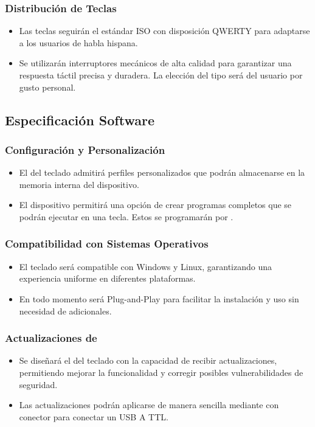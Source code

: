 \subsubsection{Distribución de Teclas} \label{DiseñoDistribucion}
\begin{itemize}
\item Las teclas seguirán el estándar \gls{ISO} con disposición \gls{QWERTY} para adaptarse a los usuarios de habla hispana.
\item Se utilizarán interruptores mecánicos de alta calidad para garantizar una respuesta táctil precisa y duradera. La elección del tipo será del usuario por gusto personal.
\end{itemize}

\subsection{Especificación Software} \label{DiseñoSoftware}

\subsubsection{Configuración y Personalización}
\begin{itemize}
\item El  del teclado admitirá perfiles personalizados que podrán almacenarse en la memoria interna del dispositivo.
\item El dispositivo permitirá una opción de crear programas completos que se podrán ejecutar en una tecla. Estos se programarán por .
\end{itemize}

\subsubsection{Compatibilidad con Sistemas Operativos}
\begin{itemize}
\item El teclado será compatible con \gls{Windows} y \gls{Linux}, garantizando una experiencia uniforme en diferentes plataformas.
\item En todo momento será \gls{Plug-and-Play} para facilitar la instalación y uso sin necesidad de  adicionales.
\end{itemize}

\subsubsection{Actualizaciones de } \label{DiseñoActualizaciones}
\begin{itemize}
\item Se diseñará el  del teclado con la capacidad de recibir actualizaciones, permitiendo mejorar la funcionalidad y corregir posibles vulnerabilidades de seguridad.
\item Las actualizaciones podrán aplicarse de manera sencilla mediante con conector para conectar un \gls{USB} A \gls{TTL}.
\end{itemize}

